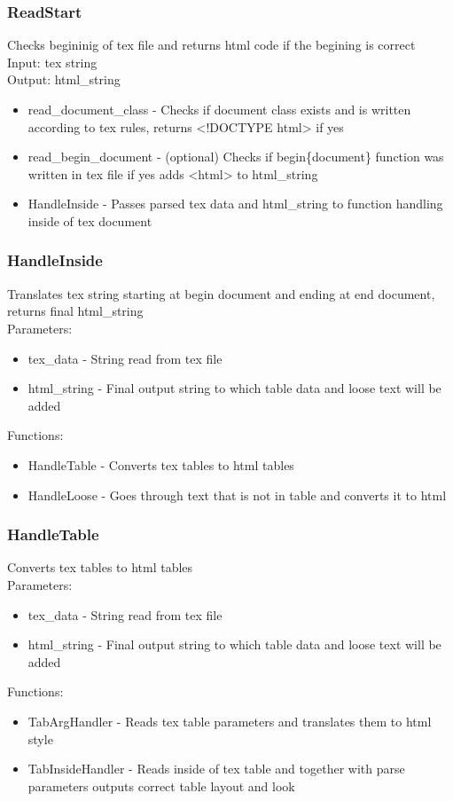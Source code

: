 \subsubsection{ReadStart}
Checks begininig of tex file and returns html code if the begining is correct \\ 
Input: tex string \\ 
Output: html\_string

\begin{itemize}
\item read\_document\_class - Checks if document class exists and is written according to tex rules, returns <!DOCTYPE html> if yes
\item read\_begin\_document - (optional) Checks if begin\{document\} function was written in tex file if yes adds <html> to html\_string
\item HandleInside - Passes parsed tex data and html\_string to function handling inside of tex document 
\end{itemize}

\subsubsection{HandleInside}
Translates tex string starting at begin document and ending at end document, returns final html\_string \\ 
Parameters: \\ 
\begin{itemize}
\item tex\_data - String read from tex file
\item html\_string - Final output string to which table data and loose text will be added 
\end{itemize}
Functions: 
\begin{itemize}
    \item HandleTable - Converts tex tables to html tables
    \item HandleLoose - Goes through text that is not in table and converts it to html  
\end{itemize}

\subsubsection{HandleTable}
Converts tex tables to html tables \\ 
Parameters: \\ 
\begin{itemize}
\item tex\_data - String read from tex file
\item html\_string - Final output string to which table data and loose text will be added 
\end{itemize}
Functions: 
\begin{itemize}
    \item TabArgHandler - Reads tex table parameters and translates them to html style
    \item TabInsideHandler - Reads inside of tex table and together with parse parameters outputs correct table layout and look
\end{itemize}

